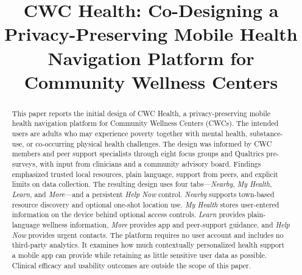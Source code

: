 \documentclass[conference,a4paper]{IEEEtran}
\begin{document}
\title{CWC Health: Co-Designing a Privacy-Preserving Mobile Health Navigation Platform for Community Wellness Centers}

\author{
}

\maketitle

\begin{abstract}
This paper reports the initial design of CWC Health, a privacy-preserving mobile
health navigation platform for Community Wellness Centers (CWCs). The intended
users are adults who may experience poverty together with mental health,
substance-use, or co-occurring physical health challenges. The design was
informed by CWC members and peer support specialists through eight focus groups
and Qualtrics pre-surveys, with input from clinicians and a community advisory
board. Findings emphasized trusted local resources, plain language, support from
peers, and explicit limits on data collection. The resulting design uses four
tabs---\emph{Nearby}, \emph{My Health}, \emph{Learn}, and \emph{More}---and a
persistent \emph{Help Now} control. \emph{Nearby} supports town-based resource
discovery and optional one-shot location use. \emph{My Health} stores
user-entered information on the device behind optional access controls.
\emph{Learn} provides plain-language wellness information, \emph{More} provides
app and peer-support guidance, and \emph{Help Now} provides urgent contacts. The
platform requires no user account and includes no third-party analytics. It examines
how much contextually personalized health support a mobile app can provide while
retaining as little sensitive user data as possible. Clinical efficacy and
usability outcomes are outside the scope of this paper.
\end{abstract}
\end{document}
